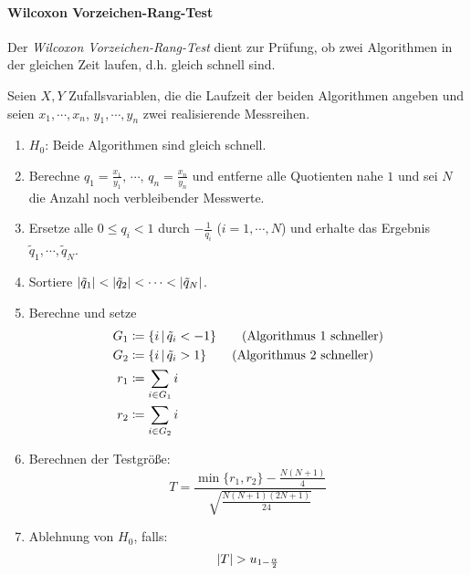         \paragraph{Wilcoxon Vorzeichen-Rang-Test}
            Der \textit{Wilcoxon Vorzeichen-Rang-Test} dient zur Prüfung, ob zwei Algorithmen in der gleichen Zeit laufen, d.h. gleich schnell sind.
            
            Seien \( X, Y \) Zufallsvariablen, die die Laufzeit der beiden Algorithmen angeben und seien \( x_1, \cdots, x_n \), \( y_1, \cdots, y_n \) zwei realisierende Messreihen.
            \begin{enumerate}
            	\item \(H_0\): \quad Beide Algorithmen sind gleich schnell.
            	\item Berechne \( q_1 = \frac{x_1}{y_1},\, \cdots,\, q_n = \frac{x_n}{y_n} \) und entferne alle Quotienten nahe \(1\) und sei \( N \) die Anzahl noch verbleibender Messwerte.
            	\item Ersetze alle \( 0 \leq q_i < 1 \) durch \( -\frac{1}{q_i} \) (\( i = 1, \cdots, N \)) und erhalte das Ergebnis \( \tilde{q}_1, \cdots, \tilde{q}_N \).
            	\item Sortiere \( \abs{\tilde{q}_1} < \abs{\tilde{q}_2} < \cdots < \abs{\tilde{q}_N} \).
            	\item Berechne und setze
                	\begin{align*}
	                	G_1 &\coloneqq \{ i \,\vert\, \tilde{q}_i < -1 \} \tag{Algorithmus 1 schneller} \\
	                	G_2 &\coloneqq \{ i \,\vert\, \tilde{q}_i > 1 \} \tag{Algorithmus 2 schneller} \\
	                	r_1 &\coloneqq \sum_{i \in G_1} i \\
	                	r_2 &\coloneqq \sum_{i \in G_2} i
                	\end{align*}
                \item Berechnen der Testgröße:
	                \begin{equation*}
		                T = \frac{\min \{ r_1, r_2 \} - \frac{N(N + 1)}{4}}{\sqrt{\frac{N(N + 1)(2N + 1)}{24}}}
	                \end{equation*}
	            \item Ablehnung von \(H_0\), falls:
		            \begin{equation*}
			            \abs{T} > u_{1 - \frac{\alpha}{2}}
		            \end{equation*}
            \end{enumerate}
    
